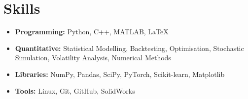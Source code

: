 \documentclass[9pt]{article} %
\begin{document}
\section{Skills}

\begin{itemize}[leftmargin=*]
    \item \textbf{Programming:} Python, C++, MATLAB, LaTeX
    \item \textbf{Quantitative:} Statistical Modelling, Backtesting, Optimisation, Stochastic Simulation, Volatility Analysis, Numerical Methods
    \item \textbf{Libraries:} NumPy, Pandas, SciPy, PyTorch, Scikit-learn, Matplotlib
    \item \textbf{Tools:} Linux, Git, GitHub, SolidWorks
\end{itemize}
\end{document}
